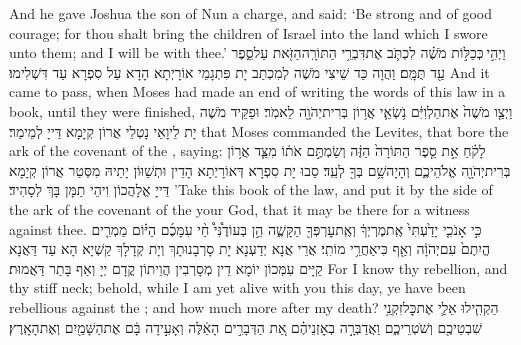 {And he gave Joshua the son of Nun a charge, and said: ‘Be strong and of good courage; for thou shalt bring the children of Israel into the land which I swore unto them; and I will be with thee.’}{}
{וַיְהִ֣י \legarmeh  כְּכַלּ֣וֹת מֹשֶׁ֗ה לִכְתֹּ֛ב אֶת\maqqaf דִּבְרֵ֥י הַתּוֹרָֽה\maqqaf הַזֹּ֖את עַל\maqqaf סֵ֑פֶר עַ֖ד תֻּמָּֽם׃}
{וַהֲוָה כַּד שֵׁיצִי מֹשֶׁה לְמִכְתַב יָת פִּתְגָמֵי אוֹרָיְתָא הָדָא עַל סִפְרָא עַד דִּשְׁלִימוּ׃}
{And it came to pass, when Moses had made an end of writing the words of this law in a book, until they were finished,}{}
{וַיְצַ֤ו מֹשֶׁה֙ אֶת\maqqaf הַלְוִיִּ֔ם נֹ֥שְׂאֵ֛י אֲר֥וֹן בְּרִית\maqqaf יְהֹוָ֖ה לֵאמֹֽר׃}
{וּפַקֵּיד מֹשֶׁה יָת לֵיוָאֵי נָטְלֵי אֲרוֹן קְיָמָא דַּייָ לְמֵימַר׃}
{that Moses commanded the Levites, that bore the ark of the covenant of the \lord, saying:}{}
{לָקֹ֗חַ אֵ֣ת סֵ֤פֶר הַתּוֹרָה֙ הַזֶּ֔ה וְשַׂמְתֶּ֣ם אֹת֔וֹ מִצַּ֛ד אֲר֥וֹן בְּרִית\maqqaf יְהֹוָ֖ה אֱלֹהֵיכֶ֑ם וְהָיָה\maqqaf שָׁ֥ם בְּךָ֖ לְעֵֽד׃}
{סַבוּ יָת סִפְרָא דְּאוֹרָיְתָא הָדֵין וּתְשַׁוּוֹן יָתֵיהּ מִסְּטַר אֲרוֹן קְיָמָא דַּייָ אֱלָהֲכוֹן וִיהֵי תַמָּן בָּךְ לְסָהִיד׃}
{’Take this book of the law, and put it by the side of the ark of the covenant of the \lord\space your God, that it may be there for a witness against thee.}{}
{כִּ֣י אָנֹכִ֤י יָדַ֙עְתִּי֙ אֶֽת\maqqaf מֶרְיְךָ֔ וְאֶֽת\maqqaf עׇרְפְּךָ֖ הַקָּשֶׁ֑ה הֵ֣ן בְּעוֹדֶ֩נִּי֩ חַ֨י עִמָּכֶ֜ם הַיּ֗וֹם מַמְרִ֤ים הֱיִתֶם֙ עִם\maqqaf יְהֹוָ֔ה וְאַ֖ף כִּי\maqqaf אַחֲרֵ֥י מוֹתִֽי׃}
{אֲרֵי אֲנָא יְדַעְנָא יָת סָרְבָנוּתָךְ וְיָת קְדָלָךְ קַשְׁיָא הָא עַד דַּאֲנָא קַיָּים עִמְּכוֹן יוֹמָא דֵין מְסָרְבִין הֲוֵיתוֹן קֳדָם יְיָ וְאַף בָּתַר דַּאֲמוּת׃}
{For I know thy rebellion, and thy stiff neck; behold, while I am yet alive with you this day, ye have been rebellious against the \lord; and how much more after my death?}{}
{הַקְהִ֧ילוּ אֵלַ֛י אֶת\maqqaf כׇּל\maqqaf זִקְנֵ֥י שִׁבְטֵיכֶ֖ם וְשֹׁטְרֵיכֶ֑ם וַאֲדַבְּרָ֣ה בְאׇזְנֵיהֶ֗ם אֵ֚ת הַדְּבָרִ֣ים הָאֵ֔לֶּה וְאָעִ֣ידָה בָּ֔ם אֶת\maqqaf הַשָּׁמַ֖יִם וְאֶת\maqqaf הָאָֽרֶץ׃}
